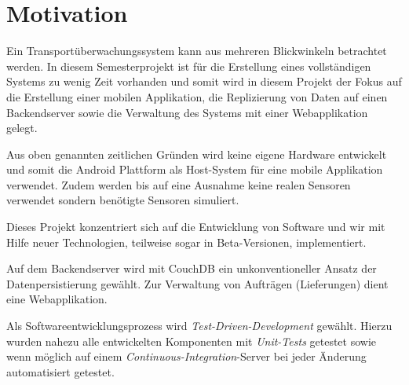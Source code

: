 \section{Motivation}

Ein Transportüberwachungssystem kann aus mehreren Blickwinkeln betrachtet werden.
	In diesem Semesterprojekt ist für die Erstellung eines vollständigen
	Systems zu wenig Zeit vorhanden und somit wird in diesem Projekt der Fokus
	auf die Erstellung einer mobilen Applikation, die Replizierung von Daten auf
	einen Backendserver sowie die Verwaltung des Systems mit einer Webapplikation
	gelegt.
	
Aus oben genannten zeitlichen Gründen wird keine eigene Hardware entwickelt und somit
	die Android Plattform als Host-System für eine mobile Applikation verwendet.
	Zudem werden bis auf eine Ausnahme keine realen Sensoren verwendet sondern
	benötigte Sensoren simuliert.

Dieses Projekt konzentriert sich auf die Entwicklung von Software und wir mit Hilfe
	neuer Technologien, teilweise sogar in Beta-Versionen, implementiert.
	
Auf dem Backendserver wird mit CouchDB ein unkonventioneller Ansatz der
	Datenpersistierung gewählt. Zur Verwaltung von Aufträgen (Lieferungen)
	dient eine Webapplikation.

Als Softwareentwicklungsprozess wird \emph{Test-Driven-Development} gewählt.
	Hierzu wurden nahezu alle entwickelten Komponenten mit \emph{Unit-Tests}
	getestet sowie wenn möglich auf einem \emph{Continuous-Integration}-Server
	bei jeder Änderung automatisiert getestet.
